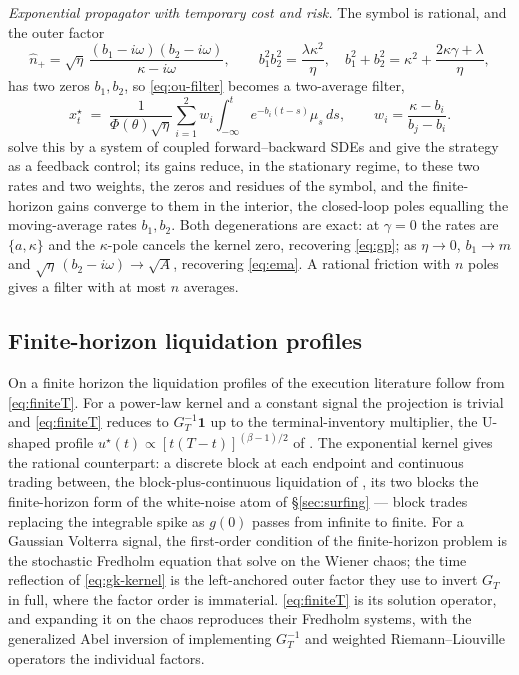 \documentclass[11pt]{article}
\theoremstyle{plain}
\theoremstyle{definition}
\theoremstyle{remark}
\begin{document}
\emph{Exponential propagator with temporary cost and risk.} The symbol is rational, and the outer factor
\begin{equation}\label{eq:nv-factor}
\hat n_+ = \sqrt\eta\,\frac{(b_1-i\omega)(b_2-i\omega)}{\kappa-i\omega}, \qquad
b_1^2b_2^2 = \frac{\lambda\kappa^2}{\eta}, \quad
b_1^2+b_2^2 = \kappa^2 + \frac{2\kappa\gamma+\lambda}{\eta},
\end{equation}
has two zeros $b_1,b_2$, so \eqref{eq:ou-filter} becomes a two-average filter,
\begin{equation}\label{eq:nv-filter}
x^\star_t \;=\; \frac{1}{\Phi(\theta)\sqrt\eta}\sum_{i=1}^2 w_i\!\int_{-\infty}^t e^{-b_i(t-s)}\mu_s\,ds,
\qquad w_i = \frac{\kappa-b_i}{b_j-b_i}.
\end{equation}
\citet{NeumanVoss2022} solve this by a system of coupled forward--backward SDEs and give the strategy as a feedback control; its gains reduce, in the stationary regime, to these two rates and two weights, the zeros and residues of the symbol, and the finite-horizon gains converge to them in the interior, the closed-loop poles equalling the moving-average rates $b_1,b_2$. Both degenerations are exact: at $\gamma=0$ the rates are $\{a,\kappa\}$ and the $\kappa$-pole cancels the kernel zero, recovering \eqref{eq:gp}; as $\eta\to0$, $b_1\to m$ and $\sqrt\eta\,(b_2-i\omega)\to\sqrt A$, recovering \eqref{eq:ema}. A rational friction with $n$ poles gives a filter with at most $n$ averages.

\subsection{Finite-horizon liquidation profiles}\label{sec:powerlawFH}

On a finite horizon the liquidation profiles of the execution literature follow from \eqref{eq:finiteT}. For a power-law kernel and a constant signal the projection is trivial and \eqref{eq:finiteT} reduces to $G_T^{-1}\mathbf 1$ up to the terminal-inventory multiplier, the U-shaped profile $u^\star(t)\propto[t(T-t)]^{(\beta-1)/2}$ of \citet[Ex.~2.30]{GatheralSchiedSlynko2012}. The exponential kernel gives the rational counterpart: a discrete block at each endpoint and continuous trading between, the block-plus-continuous liquidation of \citet{ObizhaevaWang2013}, its two blocks the finite-horizon form of the white-noise atom of \S\ref{sec:surfing} --- block trades replacing the integrable spike as $g(0)$ passes from infinite to finite. For a Gaussian Volterra signal, the first-order condition of the finite-horizon problem is the stochastic Fredholm equation that \citet{FordeSanchezSmith2022} solve on the Wiener chaos; the time reflection of \eqref{eq:gk-kernel} is the left-anchored outer factor they use to invert $G_T$ in full, where the factor order is immaterial. \eqref{eq:finiteT} is its solution operator, and expanding it on the chaos reproduces their Fredholm systems, with the generalized Abel inversion of \citet{ChakrabartiGeorge1994} implementing $G_T^{-1}$ and weighted Riemann--Liouville operators the individual factors.
\end{document}

